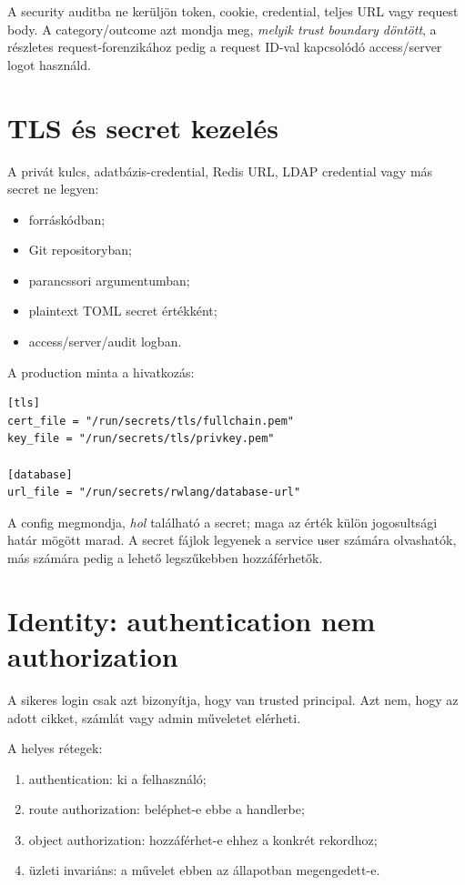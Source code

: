 A security auditba ne kerüljön token, cookie, credential, teljes URL vagy request body. A category/outcome azt mondja meg, \emph{melyik trust boundary döntött}, a részletes request-forenzikához pedig a request ID-val kapcsolódó access/server logot használd.

\section{TLS és secret kezelés}

A privát kulcs, adatbázis-credential, Redis URL, LDAP credential vagy más secret ne legyen:

\begin{itemize}
  \item forráskódban;
  \item Git repositoryban;
  \item parancssori argumentumban;
  \item plaintext TOML secret értékként;
  \item access/server/audit logban.
\end{itemize}

A production minta a  hivatkozás:

\begin{lstlisting}
[tls]
cert_file = "/run/secrets/tls/fullchain.pem"
key_file = "/run/secrets/tls/privkey.pem"

[database]
url_file = "/run/secrets/rwlang/database-url"
\end{lstlisting}

A config megmondja, \emph{hol} található a secret; maga az érték külön jogosultsági határ mögött marad. A secret fájlok legyenek a service user számára olvashatók, más számára pedig a lehető legszűkebben hozzáférhetők.

\section{Identity: authentication nem authorization}

A sikeres login csak azt bizonyítja, hogy van trusted principal. Azt nem, hogy az adott cikket, számlát vagy admin műveletet elérheti.

A helyes rétegek:

\begin{enumerate}
  \item authentication: ki a felhasználó;
  \item route authorization: beléphet-e ebbe a handlerbe;
  \item object authorization: hozzáférhet-e ehhez a konkrét rekordhoz;
  \item üzleti invariáns: a művelet ebben az állapotban megengedett-e.
\end{enumerate}

